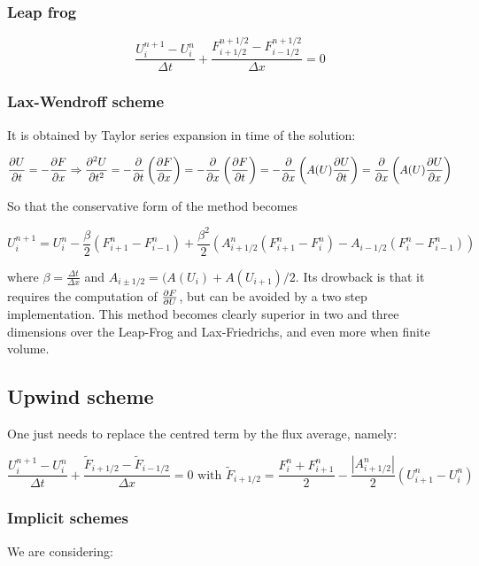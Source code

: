 \subsubsection{Leap frog}

\begin{equation}
\frac{U_i^{n+1}-U_i^n}{\Delta t}+ \frac{F^{n+1/2}_{i+1/2}-F_{i-1/2}^{n+1/2}}{\Delta x} = 0
\end{equation}
\subsubsection{Lax-Wendroff scheme}
It is obtained by Taylor series expansion in time of the solution: 

\begin{equation}
\frac{\partial U}{\partial t} = - \frac{\partial F}{\partial x} \Rightarrow \frac{\partial ^2 U}{\partial t^2} = -\frac{\partial}{\partial t}\left(\frac{\partial F}{\partial x}\right) = -\frac{\partial}{\partial x}\left(\frac{\partial F}{\partial t}\right) = -\frac{\partial}{\partial x}\left(A(U)\frac{\partial U}{\partial t}\right) = \frac{\partial}{\partial x}\left(A(U)\frac{\partial U}{\partial x}\right)
\end{equation}

So that the conservative form of the method becomes 

\begin{equation}
U_i^{n+1}  = U_i ^n - \frac{\beta}{2}(F_{i+1}^n-F_{i-1}^n)+ \frac{\beta ^2}{2}(A_{i+1/2}^n(F_{i+1}^n-F_{i}^n)-A_{i-1/2}(F_{i}^n-F_{i-1}^n))
\end{equation}

where $\beta = \frac{\Delta t}{\Delta x}$ and $A_{i\pm1/2} = (A(U_i)+A(U_{i+1})/2$. Its drowback is that it requires the computation of $\frac{\partial F}{\partial U}$, but can be avoided by a two step implementation. This method becomes clearly superior in two and three dimensions over the Leap-Frog and Lax-Friedrichs, and even more when finite volume. 

\subsection{Upwind scheme}
One just needs to replace the centred term by the flux average, namely: 

\begin{equation}
\frac{U_{i}^{n+1}-U_{i}^{n}}{\Delta t} + \frac{\tilde{F}_{i+1/2}-\tilde{F}_{i-1/2}}{\Delta x} = 0 \mbox{ with } \tilde{F}_{i+1/2} = \frac{F_{i}^n+F_{i+1}^n}{2}- \frac{|A_{i+1/2}^n|}{2}(U_{i+1}^n-U_{i}^n)
\end{equation}

\subsubsection{Implicit schemes}
We are considering: 


